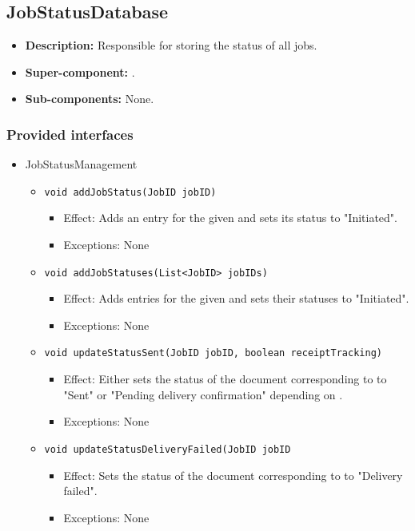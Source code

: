 \subsection{JobStatusDatabase}
\begin{itemize}
    \item \textbf{Description:} Responsible for storing the status of all jobs.
    \item \textbf{Super-component:} .
    \item \textbf{Sub-components:} None.
\end{itemize}

\subsubsection*{Provided interfaces}
\begin{itemize}
    \item JobStatusManagement
    \begin{itemize}
		\item \texttt{void addJobStatus(JobID jobID)}
		\begin{itemize}
            \item Effect: Adds an entry for the given  and sets its status to "Initiated".
            \item Exceptions: None
        \end{itemize}

		\item \texttt{void addJobStatuses(List<JobID> jobIDs)}
		\begin{itemize}
            \item Effect: Adds entries for the given  and sets their statuses to "Initiated".
            \item Exceptions: None
        \end{itemize}

		\item \texttt{void updateStatusSent(JobID jobID, boolean receiptTracking)}
		\begin{itemize}
            \item Effect: Either sets the status of the document corresponding to  to "Sent" or "Pending delivery confirmation" depending on .
            \item Exceptions: None
        \end{itemize}

		\item \texttt{void updateStatusDeliveryFailed(JobID jobID}
		\begin{itemize}
            \item Effect: Sets the status of the document corresponding to  to "Delivery failed".
            \item Exceptions: None
        \end{itemize}


\end{itemize}
\end{itemize}
